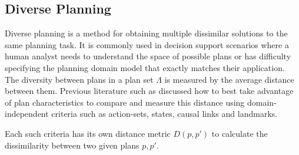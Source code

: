 \subsection{Diverse Planning}
\label{background: Diverse}
Diverse planning is a method for obtaining multiple dissimilar solutions to the same planning task.
 It is commonly used in decision support scenarios where a human analyst needs to understand the space 
of possible plans or has difficulty specifying the planning domain model that exactly matches their application.
The diversity between plans in a plan set $\Lambda$ is measured by the average distance between them.
Previous literature such as \cite{bryce2014landmark} discussed how to best take advantage of plan characteristics 
to compare and measure this distance using domain-independent criteria such as action-sets, states, causal links and landmarks.





Each such criteria has its own distance metric $D(p,p')$ to calculate the dissimilarity between two given plans $p,p'$. 

